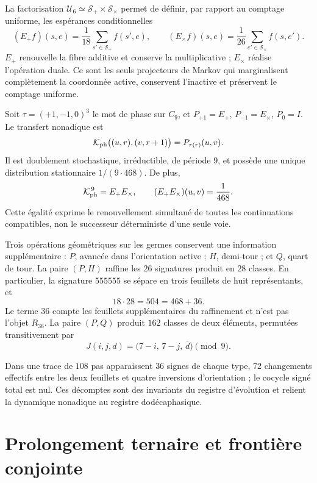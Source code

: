 La factorisation \(\mathcal U_6\simeq\mathcal S_+\times\mathcal S_\times\)
permet de définir, par rapport au comptage uniforme, les espérances conditionnelles
\[
 (E_+f)(s,e)=\frac1{18}\sum_{s'\in\mathcal S_+}f(s',e),
 \qquad
 (E_\times f)(s,e)=\frac1{26}
 \sum_{e'\in\mathcal S_\times}f(s,e').
\]
\(E_+\) renouvelle la fibre additive et conserve la multiplicative ;
\(E_\times\) réalise l'opération duale. Ce sont les seuls projecteurs de Markov
qui marginalisent complètement la coordonnée active, conservent l'inactive et
préservent le comptage uniforme.

Soit \(\tau=(+1,-1,0)^3\) le mot de phase sur \(C_9\), et
\(P_{+1}=E_+\), \(P_{-1}=E_\times\), \(P_0=I\). Le transfert nonadique est
\[
 \mathcal K_{\rm ph}\bigl((u,r),(v,r+1)\bigr)
 =P_{\tau(r)}(u,v).
\]
Il est doublement stochastique, irréductible, de période \(9\), et possède une unique
distribution stationnaire \(1/(9\cdot468)\). De plus,
\[
 \mathcal K_{\rm ph}^{\,9}=E_+E_\times,\qquad
 (E_+E_\times)(u,v)=\frac1{468}.
\]
Cette égalité exprime le renouvellement simultané de toutes les continuations
compatibles, non le successeur déterministe d'une seule voie.

Trois opérations géométriques sur les germes conservent une information
supplémentaire : \(P\), avancée dans l'orientation active ; \(H\), demi-tour ; et
\(Q\), quart de tour. La paire \((P,H)\) raffine les \(26\) signatures produit
en \(28\) classes. En particulier, la signature \(555555\) se sépare en trois feuillets
de huit représentants, et
\[
 18\cdot28=504=468+36.
\]
Le terme \(36\) compte les feuillets supplémentaires du raffinement et n'est pas
l'objet \(R_{36}\). La paire \((P,Q)\) produit \(162\) classes de deux
éléments, permutées transitivement par
\[
 J(i,j,d)=\bigl(7-i,\,7-j,\,\overline d\bigr)\pmod9.
\]

Dans une trace de \(108\) pas apparaissent \(36\) signes de chaque type,
\(72\) changements effectifs entre les deux feuillets et quatre inversions
d'orientation ; le cocycle signé total est nul. Ces décomptes sont des invariants
du registre d'évolution et relient la dynamique nonadique au registre dodécaphasique.

\section{Prolongement ternaire et frontière conjointe}

